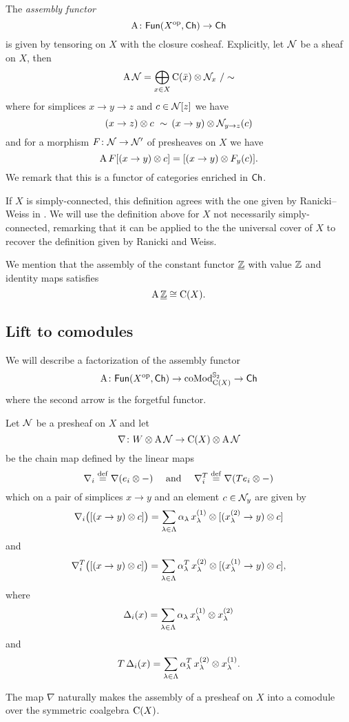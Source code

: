 The \textit{assembly functor}
\[
\operatorname{A} \colon \mathsf{Fun}(X^{\mathrm{op}}, \mathsf{Ch}) \to \mathsf{Ch}
\]
is given by tensoring on $X$ with the closure cosheaf.
Explicitly, let $\mathcal{N}$ be a sheaf on $X$, then
\[
\operatorname{A} \mathcal{N} = \bigoplus_{x \in X} \operatorname{C}(\bar x) \otimes \mathcal{N}_x \ / \sim
\]
where for simplices $x \to y \to z$ and $c \in \mathcal{N}[z]$ we have
\[
(x \to z) \otimes c \ \sim \, (x \to y) \otimes \mathcal{N}_{y \to z}(c)
\]
and for a morphism $F \colon \mathcal{N} \to \mathcal{N}'$ of presheaves on $X$ we have
\[
\operatorname{A} F[(x \to y) \otimes c] = [(x \to y) \otimes F_y(c)].
\]
We remark that this is a functor of categories enriched in $\mathsf{Ch}$.

If $X$ is simply-connected, this definition agrees with the one given by Ranicki--Weiss in \cite[Definition 1.4]{ranicki1990assembly}.
We will use the definition above for $X$ not necessarily simply-connected, remarking that it can be applied to the the universal cover of $X$ to recover the definition given by Ranicki and Weiss.

We mention that the assembly of the constant functor $\underline {\mathbb{Z}}$ with value $\mathbb{Z}$ and identity maps satisfies
\[
\operatorname{A} \underline{\mathbb{Z}} \cong \operatorname{C}(X).
\]

\subsection{Lift to comodules}

We will describe a factorization of the assembly functor
\[
\operatorname{A} \colon \mathsf{Fun}(X^{\mathrm{op}}, \mathsf{Ch}) \to \operatorname{coMod}^{\mathbb{S}_2}_{\operatorname{C}(X)} \to \mathsf{Ch}
\]
where the second arrow is the forgetful functor.

Let $\mathcal{N}$ be a presheaf on $X$ and let
\[
\nabla \colon W \otimes \operatorname{A} \mathcal{N} \to \operatorname{C}(X) \otimes \operatorname{A} \mathcal{N}
\]
be the chain map defined by the linear maps
\[
\nabla_i \stackrel{\mathrm{def}}{=} \nabla(e_i \otimes -)
\quad \text{ and } \quad
\nabla_i^T \stackrel{\mathrm{def}}{=} \nabla(Te_i \otimes -)
\]
which on a pair of simplices $x \to y$ and an element $c \in \mathcal{N}_y$ are given by
\[
\nabla_i \big( [(x \to y) \otimes c] \big) =
\sum_{\lambda \in \Lambda} \alpha_\lambda \, x_\lambda^{(1)} \otimes [(x_\lambda^{(2)} \to y) \otimes c]
\]
and
\[
\nabla_i^T \big( [(x \to y) \otimes c] \big) =
\sum_{\lambda \in \Lambda} \alpha^T_\lambda \, x_\lambda^{(2)} \otimes [(x_\lambda^{(1)} \to y) \otimes c],
\]
where
\[
\operatorname{\Delta}_i(x) = \sum_{\lambda \in \Lambda} \alpha_\lambda \, x_\lambda^{(1)} \otimes x_\lambda^{(2)}
\]
and
\[
T \operatorname{\Delta}_i(x) =
\sum_{\lambda \in \Lambda} \alpha^T_\lambda \, x_\lambda^{(2)} \otimes x_\lambda^{(1)}.
\]

\begin{lemma*}
	The map $\nabla$ naturally makes the assembly of a presheaf on $X$ into a comodule over the symmetric coalgebra $\operatorname{C}(X)$.
\end{lemma*}

